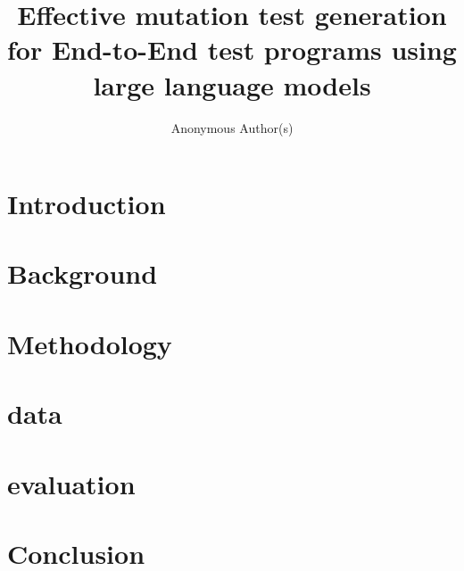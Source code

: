 \documentclass[10pt, conference]{IEEEtran}
\title{Effective mutation test generation for End-to-End test programs using large language models}
\author{Anonymous Author(s)}
\begin{document}
\maketitle





\section{Introduction}


\section{Background}



\section{Methodology}


\section{data}


\section{evaluation}


\section{Conclusion}


\balance



\end{document}
